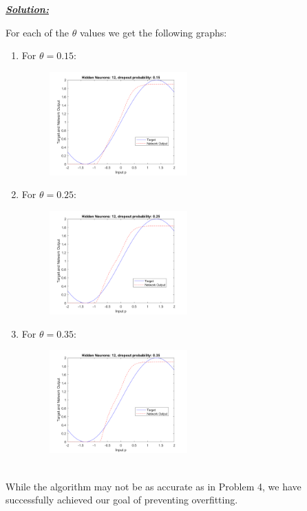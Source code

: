 \documentclass{article}
\begin{document}
\noindent \underline{\textbf{\textit{Solution:}}} 

\noindent For each of the $\theta$ values we get the following graphs:\\
\begin{enumerate}
  \item For $\theta=0.15:$ 
        \begin{figure}[h]
          \centering
          \includegraphics[width=0.5\textwidth]{Problem5_0.15.png}
        \end{figure}  
  \item For $\theta=0.25:$ 
        \begin{figure}[h]
          \centering
          \includegraphics[width=0.5\textwidth]{Problem5_0.25.png}
        \end{figure} 
  \newpage
  \item For $\theta=0.35:$ 
        \begin{figure}[h]
          \centering
          \includegraphics[width=0.5\textwidth]{Problem5_0.35.png}
        \end{figure}  
\end{enumerate} 
\noindent \\While the algorithm may not be as accurate as in Problem 4, we have successfully achieved our goal of preventing overfitting.
\end{document}
